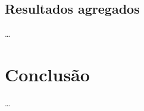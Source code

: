 \documentclass{article}
\begin{document}
\subsection{Resultados agregados}

\ldots

\section{Conclusão}

\ldots



\end{document}
